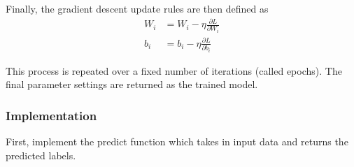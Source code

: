 \documentclass[11pt]{article}
\begin{document}
    Finally, the gradient descent update rules are then defined as \[
\begin{align}
    W_i &= W_i - \eta \frac{\partial L}{\partial W_i}\\
    b_i &= b_i - \eta \frac{\partial L}{\partial b_i}
\end{align}
\]

    This process is repeated over a fixed number of iterations (called
epochs). The final parameter settings are returned as the trained model.

    \subsubsection{Implementation}\label{implementation}

    First, implement the predict function which takes in input data and
returns the predicted labels.
\end{document}
